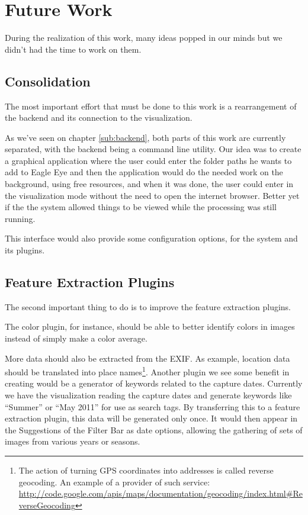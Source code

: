 \section{Future Work} %
\label{future_work}

During the realization of this work, many ideas popped in our minds but we didn't had the time to work on them.

\subsection{Consolidation} %
\label{sec:consolidation}

The most important effort that must be done to this work is a rearrangement of the backend and its connection to the visualization.

As we've seen on chapter \ref{sub:backend}, both parts of this work are currently separated, with the backend being a command line utility. Our idea was to create a graphical application where the user could enter the folder paths he wants to add to Eagle Eye and then the application would do the needed work on the background, using free resources, and when it was done, the user could enter in the visualization mode without the need to open the internet browser. Better yet if the the system allowed things to be viewed while the processing was still running.

This interface would also provide some configuration options, for the system and its plugins.


\subsection{Feature Extraction Plugins} %
\label{sec:feature_extraction}

The second important thing to do is to improve the feature extraction plugins.

The color plugin, for instance, should be able to better identify colors in images instead of simply make a color average.

More data should also be extracted from the EXIF. As example, location data should be translated into place names\footnote{The action of turning GPS coordinates into addresses is called reverse geocoding. An example of a provider of such service: \url{http://code.google.com/apis/maps/documentation/geocoding/index.html\#ReverseGeocoding}}. Another plugin we see some benefit in creating would be a generator of keywords related to the capture dates. Currently we have the visualization reading the capture dates and generate keywords like ``Summer'' or ``May 2011'' for use as search tags. By transferring this to a feature extraction plugin, this data will be generated only once. It would then appear in the Suggestions of the Filter Bar as date options, allowing the gathering of sets of images from various years or seasons.

